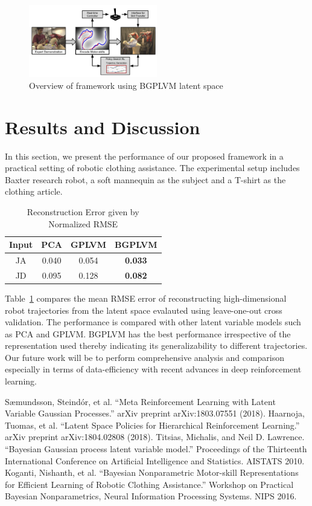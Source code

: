 \documentclass[letterpaper, 10 pt, conference]{ieeeconf}
\begin{document}
\begin{figure}
	\centering
	\includegraphics[width=0.5\textwidth]{overview.pdf}
	\caption{Overview of framework using BGPLVM latent space}
	\label{figure:overview}
\end{figure}

\section{Results and Discussion}
In this section, we present the performance of our proposed framework in a practical setting of robotic clothing assistance. The experimental setup includes Baxter research robot, a soft mannequin as the subject and a T-shirt as the clothing article. 
\begin{table}[h]
	\centering
	\caption{Reconstruction Error given by Normalized RMSE}
	\begin{tabular}{|c|c|c|c|}
		\hline
		Input & PCA & GPLVM & BGPLVM \\
		\hline
		JA & 0.040 & 0.054 & \textbf{0.033} \\
		JD & 0.095 & 0.128 & \textbf{0.082} \\
		\hline
	\end{tabular}
	\label{table:results}
\end{table}
Table~\ref{table:results} compares the mean RMSE error of reconstructing high-dimensional robot trajectories from the latent space evalauted using leave-one-out cross validation. The performance is compared with other latent variable models such as PCA and GPLVM. BGPLVM has the best performance irrespective of the representation used thereby indicating its generalizability to different trajectories. Our future work will be to perform comprehensive analysis and comparison especially in terms of data-efficiency with recent advances in deep reinforcement learning.

\begin{thebibliography}{10}
Sæmundsson, Steindór, et al. ``Meta Reinforcement Learning with Latent Variable Gaussian Processes.'' arXiv preprint arXiv:1803.07551 (2018).
Haarnoja, Tuomas, et al. ``Latent Space Policies for Hierarchical Reinforcement Learning.'' arXiv preprint arXiv:1804.02808 (2018).
Titsias, Michalis, and Neil D. Lawrence. ``Bayesian Gaussian process latent variable model.'' Proceedings of the Thirteenth International Conference on Artificial Intelligence and Statistics. AISTATS 2010.
Koganti, Nishanth, et al. ``Bayesian Nonparametric Motor-skill Representations for Efficient Learning of Robotic Clothing Assistance.'' Workshop on Practical Bayesian Nonparametrics, Neural Information Processing Systems. NIPS 2016.
\end{thebibliography}
\end{document}
